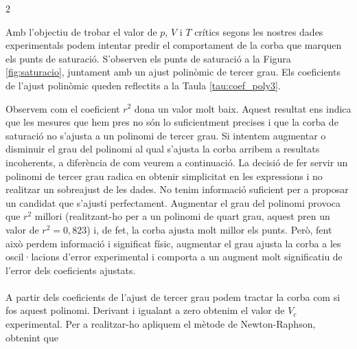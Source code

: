 \documentclass[12pt,twosides,onecolumn,openany]{article}
\newenvironment{Figura}
  {\par\medskip\noindent\minipage{\linewidth}}
  {\endminipage\par\medskip}
\begin{document}
\begin{multicols}{2}
\begin{Figura}
\end{Figura}
Amb l'objectiu de trobar el valor de $p$, $V$ i $T$ crítics segons les nostres dades experimentals podem intentar predir el comportament de la corba que marquen els punts de saturació. S'observen els punts de saturació a la Figura \ref{fig:saturacio}, juntament amb un ajust polinòmic de tercer grau. Els coeficients de l'ajust polinòmic queden reflectits a la Taula \ref{tau:coef_poly3}.
\renewcommand{\arraystretch}{1.48}
\begin{Figura}
  \centering
  \label{tau:coef_poly3}
\end{Figura}
\renewcommand{\arraystretch}{1}
Observem com el coeficient $r^2$ dona un valor molt baix. Aquest resultat ens indica que les mesures que hem pres no són lo suficientment precises i que la corba de saturació no s'ajusta a un polinomi de tercer grau. Si intentem augmentar o disminuir el grau del polinomi al qual s'ajusta la corba arribem a resultats incoherents, a diferència de com veurem a continuació. La decisió de fer servir un polinomi de tercer grau radica en obtenir simplicitat en les expressions i no realitzar un sobreajust de les dades. No tenim informació suficient per a proposar un candidat que s'ajusti perfectament. Augmentar el grau del polinomi provoca que $r^2$ millori (realitzant-ho per a un polinomi de quart grau, aquest pren un valor de \(r^2 =  0,823\)) i, de fet, la corba ajusta molt millor els punts. Però, fent això perdem informació i significat físic, augmentar el grau ajusta la corba a les oscil·lacions d'error experimental i comporta a un augment molt significatiu de l'error dels coeficients ajustats.\\\\
A partir dels coeficients de l'ajust de tercer grau podem tractar la corba com si fos aquest polinomi. Derivant i igualant a zero obtenim el valor de $V_c$ experimental. Per a realitzar-ho apliquem el mètode de Newton-Raphson, obtenint que

\end{multicols}
\end{document}
